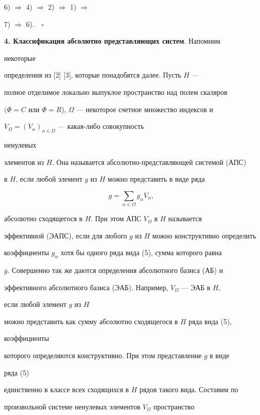 6) $\Rightarrow$ 4) $\Rightarrow$ 2) $\Rightarrow$ 1) $\Rightarrow$


7) $\Rightarrow$ 6).$\quad\square$


\medskip





{\bf 4. Классификация абсолютно представляющих систем}. Напомним 


некоторые


определения из [2] [3], которые понадобятся далее. Пусть $H$ ---


полное отделимое локально выпуклое пространство над полем скаляров


$(\Phi=C$ или $\Phi=R$), $\Omega$ --- некоторое счетное множество индексов и


$V_{\Omega}=(V_{\alpha})_{\alpha\in\Omega}$ --- какая-либо совокупность


ненулевых


элементов из $H$. Она называется абсолютно-представляющей системой (АПС)


в $H$, если любой элемент $g$ из $H$ можно представить в виде ряда


\begin{equation}


g=\sum_{\alpha\in \Omega}g_{\alpha}V_{\alpha},


\end{equation}


абсолютно сходящегося в $H$. При этом АПС $V_{\Omega}$ в $H$ называется


эффективной (ЭАПС), если для любого $g$ из $H$ можно конструктивно определить


коэффициенты $g_{\alpha}$ хотя бы одного ряда вида (5), сумма которого равна


$g$. Совершенно так же даются определения абсолютного базиса (АБ) и 


эффективного абсолютного базиса (ЭАБ). Например, $V_{\Omega}$ --- ЭАБ в $H$,


если любой элемент $g$ из $H$


можно представить как сумму абсолютно сходящегося в $H$ ряда вида (5),


коэффициенты


которого определяются конструктивно. При этом представление $g$ в виде


ряда (5)


единственно в классе всех сходящихся в $H$ рядов такого вида. Составим по


произвольной системе ненулевых элементов $V_{\Omega}$ пространство


